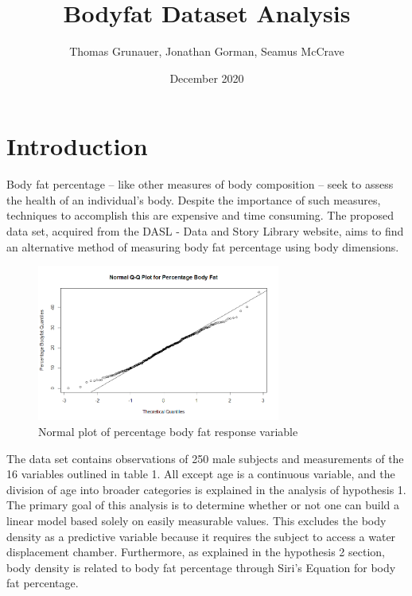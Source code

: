 \documentclass[12pt]{article}
\title{Bodyfat Dataset Analysis}
\author{ Thomas Grunauer, Jonathan Gorman, Seamus McCrave}
\date{December 2020}
\begin{document}
\maketitle

\section*{Introduction}

Body fat percentage -- like other measures of body composition -- seek to assess the health of an individual's body. Despite the importance of such measures, techniques to accomplish this are expensive and time consuming. The proposed data set, acquired from the DASL - Data and Story Library website, aims to find an alternative method of measuring body fat percentage using body dimensions. \cite{Tamhane}

\begin{figure}[h]
\centering
\includegraphics[width = 80mm]{qqplot_original_data_pctBF.PNG}
\caption{Normal plot of percentage body fat response variable}
\label{qqnorm_BF}
\end{figure}

The data set contains observations of 250 male subjects and measurements of the 16 variables outlined in table 1.\cite{Description} All except age is a continuous variable, and the division of age into broader categories is explained in the analysis of hypothesis 1. The primary goal of this analysis is to determine whether or not one can build a linear model based solely on easily measurable values. This excludes the body density as a predictive variable because it requires the subject to access a water displacement chamber. Furthermore, as explained in the hypothesis 2 section, body density is related to body fat percentage through Siri's Equation for body fat percentage\cite{sciencedirect}.
\end{document}
